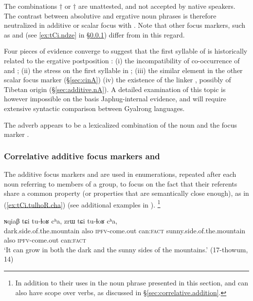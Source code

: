 The combinations $\dagger$ or $\dagger$ are unattested, and not accepted by native speakers. The contrast between absolutive and ergative noun phrases is therefore neutralized in additive or scalar focus with . Note that other focus markers, such as  and  (see \ref{ex:tCi.ndze} in §\ref{sec:ri.additive}) differ from  in this regard.

Four pieces of evidence converge to suggest that the first syllable of  is historically related to the ergative postposition : (i) the incompatibility of co-occurrence of  and ; (ii) the stress on the first syllable in ; (iii) the similar  element in the other scalar focus marker  (§\ref{sec:cinA}) (iv) the existence of the linker , possibly of Tibetan origin (§\ref{sec:additive.nA}). A detailed examination of this topic is however impossible on the basis Japhug-internal evidence, and will require extensive syntactic comparison between Gyalrong languages.

The adverb  appears to be a lexicalized combination of the noun  and the focus marker .

 \subsubsection{Correlative additive focus markers  and } \label{sec:ri.additive} 
 The additive focus markers  and   are used in enumerations, repeated after each noun referring to  members of a group, to focus on the fact that their referents share a common property (or properties that are semantically close enough), as in (\ref{ex:tCi.tulhoR.cha}) (see additional examples in \citealt[313--314]{jacques14linking}). \footnote{In addition to their uses in the noun phrase presented in this section,     and    can also have scope over verbs, as discussed in §\ref{sec:correlative.addition}. } 
  
 \begin{exe}
\ex \label{ex:tCi.tulhoR.cha}
 \gll  ɴqiaβ tɕi tu-ɬoʁ cʰa, zrɯ tɕi tu-ɬoʁ cʰa, \\
 dark.side.of.the.mountain also \textsc{ipfv}-come.out can:\textsc{fact}   sunny.side.of.the.mountain also \textsc{ipfv}-come.out can:\textsc{fact}  \\
 \glt `It can grow in both the dark and the sunny sides of the mountains.' (17-thowum, 14)
\end{exe}
  
